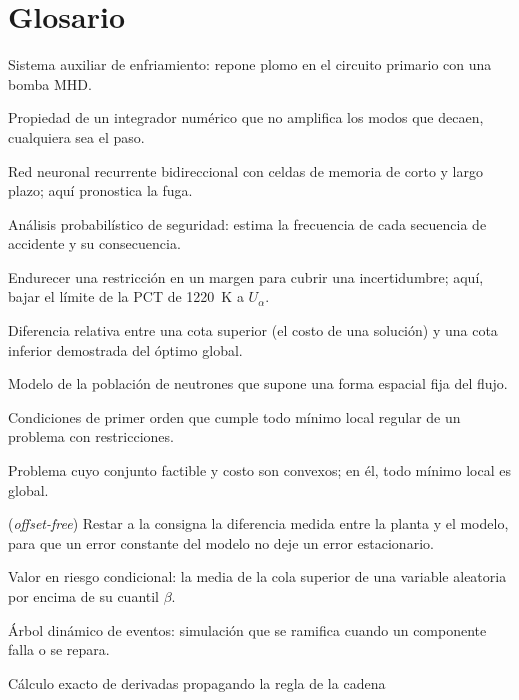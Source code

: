 \section{Glosario}
\begin{description}[style=nextline, leftmargin=0pt, itemsep=3pt]
  \item[ACS] Sistema auxiliar de enfriamiento: repone plomo en el circuito primario con una
        bomba MHD.
  \item[A-estable] Propiedad de un integrador numérico que no amplifica los modos que decaen,
        cualquiera sea el paso.
  \item[BiLSTM] Red neuronal recurrente bidireccional con celdas de memoria de corto y largo
        plazo; aquí pronostica la fuga.
  \item[APS] Análisis probabilístico de seguridad: estima la frecuencia de cada secuencia de
        accidente y su consecuencia.
  \item[Back-off] Endurecer una restricción en un margen para cubrir una incertidumbre; aquí,
        bajar el límite de la PCT de 1220~K a $U_\alpha$.
  \item[Brecha de optimalidad] Diferencia relativa entre una cota superior (el costo de una
        solución) y una cota inferior demostrada del óptimo global.
  \item[Cinética puntual] Modelo de la población de neutrones que supone una forma espacial
        fija del flujo.
  \item[Condiciones KKT] Condiciones de primer orden que cumple todo mínimo local regular de un
        problema con restricciones.
  \item[Convexo] Problema cuyo conjunto factible y costo son convexos; en él, todo mínimo local
        es global.
  \item[Corrección de sesgo] (\emph{offset-free}) Restar a la consigna la diferencia medida entre
        la planta y el modelo, para que un error constante del modelo no deje un error
        estacionario.
  \item[CVaR] Valor en riesgo condicional: la media de la cola superior de una variable aleatoria
        por encima de su cuantil $\beta$.
  \item[DET] Árbol dinámico de eventos: simulación que se ramifica cuando un componente falla o
        se repara.
  \item[Diferenciación automática] Cálculo exacto de derivadas propagando la regla de la cadena

\end{description}
